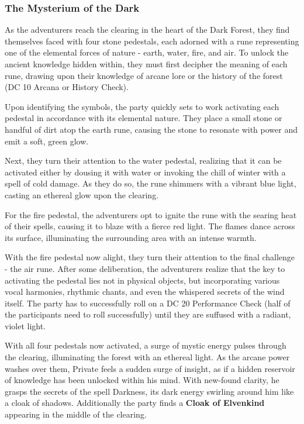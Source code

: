 \subsubsection*{The Mysterium of the Dark}
As the adventurers reach the clearing in the heart of the Dark Forest, they find themselves faced with four stone pedestals, each adorned with a rune representing one of the elemental forces of nature - earth, water, fire, and air. To unlock the ancient knowledge hidden within, they must first decipher the meaning of each rune, drawing upon their knowledge of arcane lore or the history of the forest (DC 10 Arcana or History Check).

Upon identifying the symbols, the party quickly sets to work activating each pedestal in accordance with its elemental nature. They place a small stone or handful of dirt atop the earth rune, causing the stone to resonate with power and emit a soft, green glow.

Next, they turn their attention to the water pedestal, realizing that it can be activated either by dousing it with water or invoking the chill of winter with a spell of cold damage. As they do so, the rune shimmers with a vibrant blue light, casting an ethereal glow upon the clearing.

For the fire pedestal, the adventurers opt to ignite the rune with the searing heat of their spells, causing it to blaze with a fierce red light. The flames dance across its surface, illuminating the surrounding area with an intense warmth.

With the fire pedestal now alight, they turn their attention to the final challenge - the air rune. After some deliberation, the adventurers realize that the key to activating the pedestal lies not in physical objects, but incorporating various vocal harmonies, rhythmic chants, and even the whispered secrets of the wind itself. The party has to successfully roll on a DC 20 Performance Check (half of the participants need to roll successfully) until they are suffused with a radiant, violet light.

With all four pedestals now activated, a surge of mystic energy pulses through the clearing, illuminating the forest with an ethereal light. As the arcane power washes over them, Private feels a sudden surge of insight, as if a hidden reservoir of knowledge has been unlocked within his mind. With new-found clarity, he grasps the secrets of the spell Darkness, its dark energy swirling around him like a cloak of shadows. Additionally the party finds a \textbf{Cloak of Elvenkind} appearing in the middle of the clearing.

